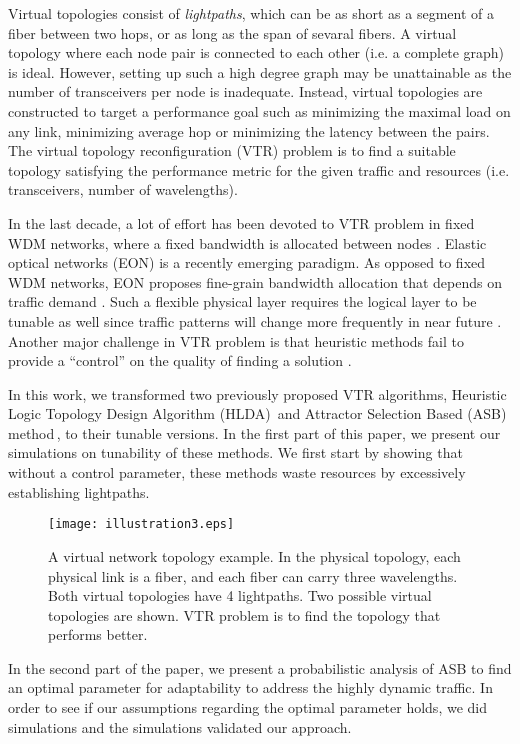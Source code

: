 \documentclass[conference]{IEEEtran}
\begin{document}
Virtual topologies consist of {\em lightpaths}, which can be as short as a segment of a fiber between two hops, or 
as long as the span of sevaral fibers.
A virtual topology where each node pair is connected to each other (i.e. a complete graph) is ideal. 
However, setting up such a high degree graph may be unattainable as the number of transceivers per node is inadequate.
Instead, virtual topologies are constructed to target a performance goal such as minimizing the maximal load on any link, minimizing average hop or minimizing 
the latency between the pairs. The virtual topology reconfiguration (VTR) problem is to find a suitable topology satisfying the performance metric for the given traffic 
and resources (i.e. transceivers, number of wavelengths).

In the last decade, a lot of effort has been devoted to VTR problem in fixed WDM networks, where 
a fixed bandwidth is allocated between nodes \cite{gencata:virtual-topology,Ramaswami:DLTW96,Leonardi:ALT08}.
Elastic optical networks (EON) is a recently emerging paradigm. As opposed to fixed WDM networks,  EON proposes fine-grain bandwidth allocation that depends on traffic demand \cite{Gerstel:EON12}. 
Such a flexible physical layer requires the logical layer to be tunable as well since traffic patterns will change more frequently in near future \cite{Gerstel2013653}.
Another major challenge in VTR problem is that heuristic methods fail to provide a ``control'' on the quality of finding a solution \cite{Leonardi:ALT08}.
 
In this work, we transformed two previously proposed VTR algorithms,
 Heuristic Logic Topology Design Algorithm (HLDA)\,\cite{Ramaswami:DLTW96} and 
 Attractor Selection Based (ASB) method\,\cite{Koizumi:10},
to their tunable versions. 
In the first part of this paper, we present our simulations on tunability of these methods.
We first start by showing that without a control parameter, these methods waste resources by  excessively establishing
lightpaths.
\begin{figure*}[tb] 
\centering
  \texttt{[image: illustration3.eps]}
\caption{ A virtual network topology example. In the physical topology, each physical link is a fiber, and 
    each fiber can carry three wavelengths. Both virtual topologies have 4 lightpaths. 
    Two possible virtual topologies are shown. VTR problem is to find the topology that performs better. 
 }
\label{vnt}
\end{figure*} 

In the second part of the paper, we present a probabilistic analysis of ASB to find an optimal parameter 
for adaptability to address the highly dynamic traffic. 
In order to see if our assumptions regarding the optimal parameter holds, we did simulations and
the simulations  validated our approach.
\end{document}
